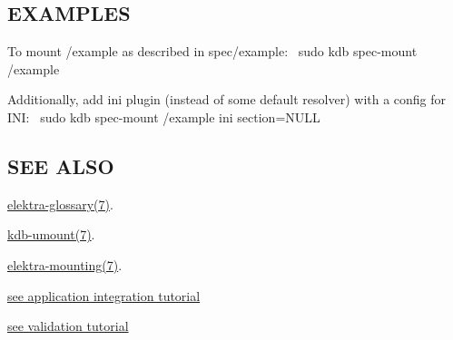 \subsection*{E\+X\+A\+M\+P\+L\+ES}

To mount /example as described in {\ttfamily spec/example}\+:~\newline
 {\ttfamily sudo kdb spec-\/mount /example}

Additionally, add {\ttfamily ini} plugin (instead of some default resolver) with a config for I\+NI\+:~\newline
 {\ttfamily sudo kdb spec-\/mount /example ini section=N\+U\+LL}

\subsection*{S\+EE A\+L\+SO}


\begin{DoxyItemize}
\item \hyperlink{doc_help_elektra-glossary_md}{elektra-\/glossary(7)}.
\item \hyperlink{doc_help_kdb-umount_md}{kdb-\/umount(7)}.
\item \hyperlink{doc_help_elektra-mounting_md}{elektra-\/mounting(7)}.
\item \hyperlink{doc_tutorials_application-integration_md}{see application integration tutorial}
\item \hyperlink{md_doc_tutorials_validation_doc_tutorials_validation_md}{see validation tutorial} 
\end{DoxyItemize}